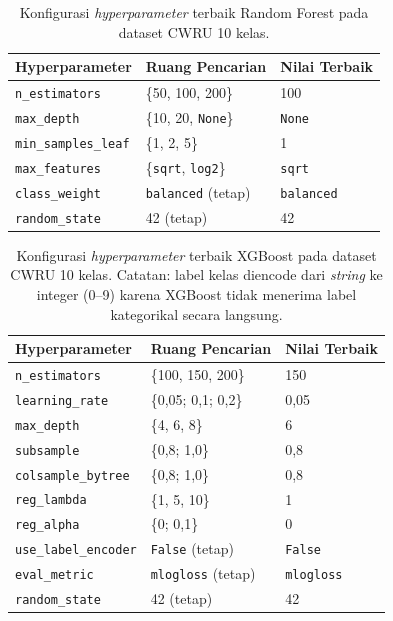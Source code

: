\begin{table}[ht]
  \centering
  \caption{Konfigurasi \emph{hyperparameter} terbaik Random Forest
           pada dataset CWRU 10 kelas.}
  \label{tab:lampF_hparam_rf}
  \footnotesize
  \begin{tabularx}{\textwidth}{@{}l X X@{}}
    \toprule
    \textbf{Hyperparameter} & \textbf{Ruang Pencarian} & \textbf{Nilai Terbaik} \\
    \midrule
    \texttt{n\_estimators}     & \{50, 100, 200\}                    & 100 \\
    \texttt{max\_depth}        & \{10, 20, \texttt{None}\}           & \texttt{None} \\
    \texttt{min\_samples\_leaf}& \{1, 2, 5\}                         & 1 \\
    \texttt{max\_features}     & \{\texttt{sqrt}, \texttt{log2}\}    & \texttt{sqrt} \\
    \texttt{class\_weight}     & \texttt{balanced} (tetap)           & \texttt{balanced} \\
    \texttt{random\_state}     & 42 (tetap)                          & 42 \\
    \bottomrule
  \end{tabularx}
\end{table}

\begin{table}[ht]
  \centering
  \caption{Konfigurasi \emph{hyperparameter} terbaik XGBoost
           pada dataset CWRU 10 kelas. Catatan: label kelas
           diencode dari \emph{string} ke integer (0--9) karena
           XGBoost tidak menerima label kategorikal secara langsung.}
  \label{tab:lampF_hparam_xgb}
  \footnotesize
  \begin{tabularx}{\textwidth}{@{}l X X@{}}
    \toprule
    \textbf{Hyperparameter} & \textbf{Ruang Pencarian} & \textbf{Nilai Terbaik} \\
    \midrule
    \texttt{n\_estimators}      & \{100, 150, 200\}               & 150 \\
    \texttt{learning\_rate}     & \{0,05; 0,1; 0,2\}              & 0,05 \\
    \texttt{max\_depth}         & \{4, 6, 8\}                     & 6 \\
    \texttt{subsample}          & \{0,8; 1,0\}                    & 0,8 \\
    \texttt{colsample\_bytree}  & \{0,8; 1,0\}                    & 0,8 \\
    \texttt{reg\_lambda}        & \{1, 5, 10\}                    & 1 \\
    \texttt{reg\_alpha}         & \{0; 0,1\}                      & 0 \\
    \texttt{use\_label\_encoder}& \texttt{False} (tetap)          & \texttt{False} \\
    \texttt{eval\_metric}       & \texttt{mlogloss} (tetap)       & \texttt{mlogloss} \\
    \texttt{random\_state}      & 42 (tetap)                      & 42 \\
    \bottomrule
  \end{tabularx}
\end{table}

